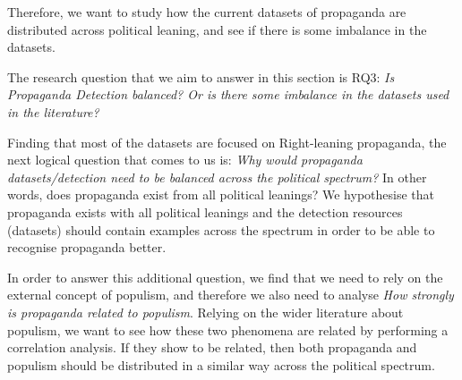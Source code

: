 
Therefore, we want to study how the current datasets of propaganda are distributed across political leaning, and see if there is some imbalance in the datasets. 





The research question that we aim to answer in this section is RQ3: \emph{Is Propaganda Detection balanced? Or is there some imbalance in the datasets used in the literature?}

Finding that most of the datasets are focused on Right-leaning propaganda, the next logical question that comes to us is: \emph{Why would propaganda datasets/detection need to be balanced across the political spectrum?} In other words, does propaganda exist from all political leanings?
We hypothesise that propaganda exists with all political leanings and the detection resources (datasets) should contain examples across the spectrum in order to be able to recognise propaganda better.

In order to answer this additional question, we find that we need to rely on the external concept of \gls{populism}, and therefore we also need to analyse \emph{How strongly is propaganda related to populism}.
Relying on the wider literature about populism, we want to see how these two phenomena are related by performing a correlation analysis.
If they show to be related, then both propaganda and populism should be distributed in a similar way across the political spectrum.



